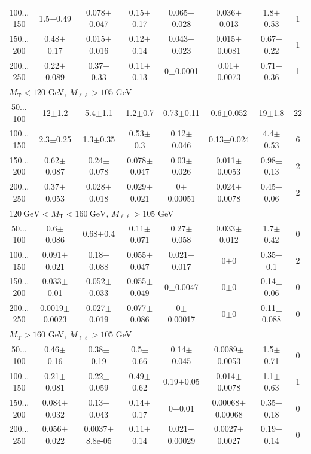 \begin{landscape}
\begin{table}
\begin{center}
\begin{tabular}{| c | c c c c c c c | }
100$\dots$150&1.5$\pm$0.49&0.078$\pm$0.047&0.15$\pm$0.17&0.065$\pm$0.028&0.036$\pm$0.013&1.8$\pm$0.53&1\\
150$\dots$200&0.48$\pm$0.17&0.015$\pm$0.016&0.12$\pm$0.14&0.043$\pm$0.023&0.015$\pm$0.0081&0.67$\pm$0.22&1\\
200$\dots$250&0.22$\pm$0.089&0.37$\pm$0.33&0.11$\pm$0.13&0$\pm$0.0001&0.01$\pm$0.0073&0.71$\pm$0.36&1\\
\hline\hline
\multicolumn{7}{l}{$M_{\text{T}} < 120$ GeV, $M_{\ell\ell} > 105$ GeV}\\\hline\hline
50$\dots$100&12$\pm$1.2&5.4$\pm$1.1&1.2$\pm$0.7&0.73$\pm$0.11&0.6$\pm$0.052&19$\pm$1.8&22\\
100$\dots$150&2.3$\pm$0.25&1.3$\pm$0.35&0.53$\pm$0.3&0.12$\pm$0.046&0.13$\pm$0.024&4.4$\pm$0.53&6\\
150$\dots$200&0.62$\pm$0.087&0.24$\pm$0.078&0.078$\pm$0.047&0.03$\pm$0.026&0.011$\pm$0.0053&0.98$\pm$0.13&2\\
200$\dots$250&0.37$\pm$0.053&0.028$\pm$0.018&0.029$\pm$0.021&0$\pm$0.00051&0.024$\pm$0.0078&0.45$\pm$0.06&2\\
\hline\hline
\multicolumn{7}{l}{$120~\mathrm{GeV} < M_{\text{T}} < 160~\mathrm{GeV}$, $M_{\ell\ell} > 105$ GeV}\\\hline\hline
50$\dots$100&0.6$\pm$0.086&0.68$\pm$0.4&0.11$\pm$0.071&0.27$\pm$0.058&0.033$\pm$0.012&1.7$\pm$0.42&0\\
100$\dots$150&0.091$\pm$0.021&0.18$\pm$0.088&0.055$\pm$0.047&0.021$\pm$0.017&0$\pm$0&0.35$\pm$0.1&2\\
150$\dots$200&0.033$\pm$0.01&0.052$\pm$0.033&0.055$\pm$0.049&0$\pm$0.0047&0$\pm$0&0.14$\pm$0.06&0\\
200$\dots$250&0.0019$\pm$0.0023&0.027$\pm$0.019&0.077$\pm$0.086&0$\pm$0.00017&0$\pm$0&0.11$\pm$0.088&0\\
\hline\hline
\multicolumn{7}{l}{$M_{\text{T}} > 160$ GeV, $M_{\ell\ell} > 105$ GeV}\\\hline\hline
50$\dots$100&0.46$\pm$0.16&0.38$\pm$0.19&0.5$\pm$0.66&0.14$\pm$0.045&0.0089$\pm$0.0053&1.5$\pm$0.71&0\\
100$\dots$150&0.21$\pm$0.081&0.22$\pm$0.059&0.49$\pm$0.62&0.19$\pm$0.05&0.014$\pm$0.0078&1.1$\pm$0.63&1\\
150$\dots$200&0.084$\pm$0.032&0.13$\pm$0.043&0.14$\pm$0.17&0$\pm$0.01&0.00068$\pm$0.00068&0.35$\pm$0.18&0\\
200$\dots$250&0.056$\pm$0.022&0.0037$\pm$8.8e-05&0.11$\pm$0.14&0.021$\pm$0.00029&0.0027$\pm$0.0027&0.19$\pm$0.14&0\\

\end{tabular}
\end{center}
\end{table}
\end{landscape}
